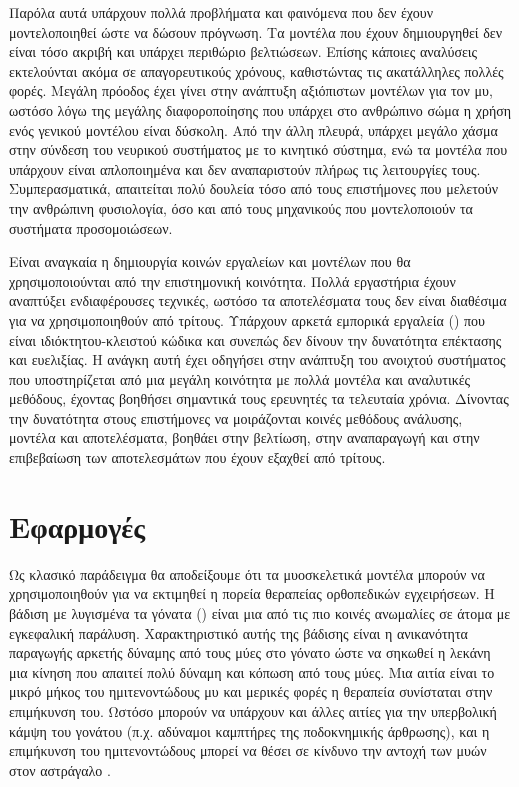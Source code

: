 Παρόλα αυτά υπάρχουν πολλά προβλήματα και φαινόμενα που δεν έχουν μοντελοποιηθεί ώστε να δώσουν πρόγνωση. Τα μοντέλα που έχουν δημιουργηθεί δεν είναι τόσο ακριβή και υπάρχει περιθώριο βελτιώσεων. Επίσης κάποιες αναλύσεις εκτελούνται ακόμα σε απαγορευτικούς χρόνους, καθιστώντας τις ακατάλληλες πολλές φορές. Μεγάλη πρόοδος έχει γίνει στην ανάπτυξη αξιόπιστων μοντέλων για τον μυ, ωστόσο λόγω της μεγάλης διαφοροποίησης που υπάρχει στο ανθρώπινο σώμα η χρήση ενός γενικού μοντέλου είναι δύσκολη. Από την άλλη πλευρά, υπάρχει μεγάλο χάσμα στην σύνδεση του νευρικού συστήματος με το κινητικό σύστημα, ενώ τα μοντέλα που υπάρχουν είναι απλοποιημένα και δεν αναπαριστούν πλήρως τις λειτουργίες τους. Συμπερασματικά, απαιτείται πολύ δουλεία τόσο από τους επιστήμονες που μελετούν την ανθρώπινη φυσιολογία, όσο και από τους μηχανικούς που μοντελοποιούν τα συστήματα προσομοιώσεων.

Είναι αναγκαία η δημιουργία κοινών εργαλείων και μοντέλων που θα χρησιμοποιούνται από την επιστημονική κοινότητα. Πολλά εργαστήρια έχουν αναπτύξει ενδιαφέρουσες τεχνικές, ωστόσο τα αποτελέσματα τους δεν είναι διαθέσιμα για να χρησιμοποιηθούν από τρίτους. Υπάρχουν αρκετά εμπορικά εργαλεία () που είναι ιδιόκτητου-κλειστού κώδικα και συνεπώς δεν δίνουν την δυνατότητα επέκτασης και ευελιξίας. Η ανάγκη αυτή έχει οδηγήσει στην ανάπτυξη του ανοιχτού συστήματος  που υποστηρίζεται από μια μεγάλη κοινότητα με πολλά μοντέλα και αναλυτικές μεθόδους, έχοντας βοηθήσει σημαντικά τους ερευνητές τα τελευταία χρόνια. Δίνοντας την δυνατότητα στους επιστήμονες να μοιράζονται κοινές μεθόδους ανάλυσης, μοντέλα και αποτελέσματα, βοηθάει στην βελτίωση, στην αναπαραγωγή και στην επιβεβαίωση των αποτελεσμάτων που έχουν εξαχθεί από τρίτους.

\section{Εφαρμογές}

Ως κλασικό παράδειγμα θα αποδείξουμε ότι τα μυοσκελετικά μοντέλα μπορούν να χρησιμοποιηθούν για να εκτιμηθεί η πορεία θεραπείας ορθοπεδικών εγχειρήσεων. Η βάδιση με λυγισμένα τα γόνατα () είναι μια από τις πιο κοινές ανωμαλίες σε άτομα με εγκεφαλική παράλυση. Χαρακτηριστικό αυτής της βάδισης είναι η ανικανότητα παραγωγής αρκετής δύναμης από τους μύες στο γόνατο ώστε να σηκωθεί η λεκάνη μια κίνηση που απαιτεί πολύ δύναμη και κόπωση από τους μύες.  Μια αιτία είναι το μικρό μήκος του ημιτενοντώδους μυ και μερικές φορές η θεραπεία συνίσταται στην επιμήκυνση του. Ωστόσο μπορούν να υπάρχουν και άλλες αιτίες για την υπερβολική κάμψη του γονάτου (π.χ. αδύναμοι καμπτήρες της ποδοκνημικής άρθρωσης), και η επιμήκυνση του ημιτενοντώδους μπορεί να θέσει σε κίνδυνο την αντοχή των μυών στον αστράγαλο \cite{arnolda06}.

